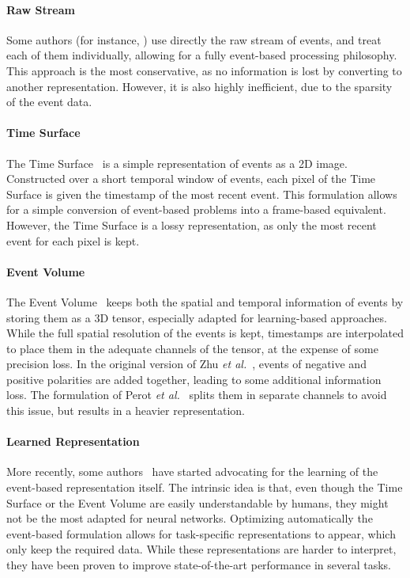 \paragraph{Raw Stream}
Some authors (for instance, \cite{Weikersdorfer2012EventbasedPF,Gallego2016EventBased6C,Gruel2022NeuromorphicES}) use directly the raw stream of events, and treat each of them individually, allowing for a fully event-based processing philosophy. This approach is the most conservative, as no information is lost by converting to another representation. However, it is also highly inefficient, due to the sparsity of the event data.

\paragraph{Time Surface}
The Time Surface~\cite{Delbrck2008FramefreeDD,Lagorce2017HOTSAH} is a simple representation of events as a 2D image. Constructed over a short temporal window of events, each pixel of the Time Surface is given the timestamp of the most recent event. This formulation allows for a simple conversion of event-based problems into a frame-based equivalent. However, the Time Surface is a lossy representation, as only the most recent event for each pixel is kept.

\paragraph{Event Volume}
The Event Volume~\cite{Zhu2019UnsupervisedEL,Perot2020LearningTD} keeps both the spatial and temporal information of events by storing them as a 3D tensor, especially adapted for learning-based approaches. While the full spatial resolution of the events is kept, timestamps are interpolated to place them in the adequate channels of the tensor, at the expense of some precision loss. In the original version of Zhu \textit{et al.}~\cite{Zhu2019UnsupervisedEL}, events of negative and positive polarities are added together, leading to some additional information loss. The formulation of Perot \textit{et al.}~\cite{Perot2020LearningTD} splits them in separate channels to avoid this issue, but results in a heavier representation.

\paragraph{Learned Representation}
More recently, some authors~\cite{Gehrig2019EndtoEndLO,Zubic2023FromCC} have started advocating for the learning of the event-based representation itself. The intrinsic idea is that, even though the Time Surface or the Event Volume are easily understandable by humans, they might not be the most adapted for neural networks. Optimizing automatically the event-based formulation allows for task-specific representations to appear, which only keep the required data. While these representations are harder to interpret, they have been proven to improve state-of-the-art performance in several tasks.

